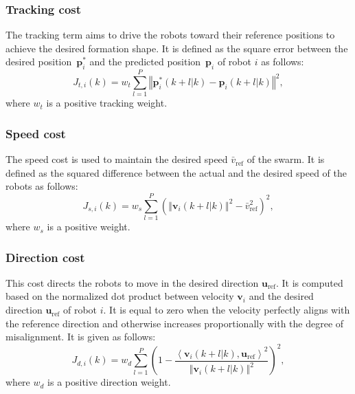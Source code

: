 \subsubsection{Tracking cost}\label{sec:tracking_term}
The tracking term aims to drive the robots toward their reference positions to achieve the desired formation shape. It is defined as the square error between the desired position~$\mathbf{p}_i^*$ and the predicted position~$\mathbf{p}_i$ of robot $i$ as follows:
\begin{equation}
    J_{t,i}(k)=w_t\sum_{l=1}^P{\left\Vert \mathbf{p}^*_i(k+l|k)-\mathbf{p}_i(k+l|k)\right\Vert^2},
\end{equation}
where $w_t$ is a positive tracking weight.

\subsubsection{Speed cost}
The speed cost is used to maintain the desired speed $\bar{v}_\text{ref}$ of the swarm. It is defined as the squared difference between the actual and the desired speed of the robots as follows:
\begin{equation}
    J_{s,i}(k)=w_s\sum_{l=1}^P\left(\left\Vert \mathbf{v}_i(k+l|k)\right\Vert^2-\bar{v}_\text{ref}^2\right)^2,
\end{equation}
where $w_s$ is a positive weight.

\subsubsection{Direction cost}
This cost directs the robots to move in the desired direction $\mathbf{u}_\text{ref}$. It is computed based on the normalized dot product between velocity $\mathbf{v}_i$ and the desired direction $\mathbf{u}_\text{ref}$ of robot $i$. It is equal to zero when the velocity perfectly aligns with the reference direction and otherwise increases proportionally with the degree of misalignment. It is given as follows:
\begin{equation}
    J_{d,i}(k)=w_d\sum_{l=1}^P{\left(1-\dfrac{\left\langle \mathbf{v}_i\left(k+l|k\right),\mathbf{u}_\text{ref}\right\rangle^2}{\left\Vert \mathbf{v}_i(k+l|k)\right\Vert^2}\right)^2},
\end{equation}
where $w_d$ is a positive direction weight.

